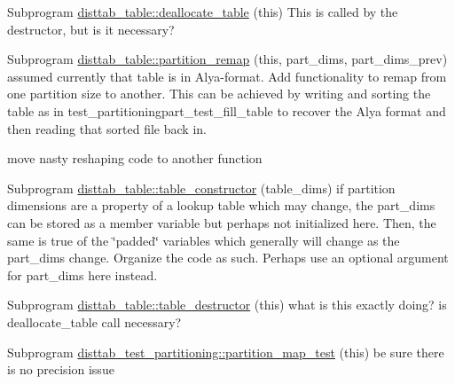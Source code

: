 
\begin{DoxyRefList}
\item[Subprogram \mbox{\hyperlink{namespacedisttab__table_ab8a2b8fd8aed669c2284a5b070f39492}{disttab\+\_\+table\+::deallocate\+\_\+table}} (this)]\label{todo__todo000004}%
%
This is called by the destructor, but is it necessary?  
\item[Subprogram \mbox{\hyperlink{namespacedisttab__table_a48241397777b4e586f1d9cf4389fae7d}{disttab\+\_\+table\+::partition\+\_\+remap}} (this, part\+\_\+dims, part\+\_\+dims\+\_\+prev)]\label{todo__todo000003}%
%
assumed currently that table is in Alya-\/format. Add functionality to remap from one partition size to another. This can be achieved by writing and sorting the table as in test\+\_\+partitioningpart\+\_\+test\+\_\+fill\+\_\+table to recover the Alya format and then reading that sorted file back in. 

move nasty reshaping code to another function  
\item[Subprogram \mbox{\hyperlink{namespacedisttab__table_a51096402e00064f68a6c890b6c0d8500}{disttab\+\_\+table\+::table\+\_\+constructor}} (table\+\_\+dims)]\label{todo__todo000001}%
%
if partition dimensions are a property of a lookup table which may change, the part\+\_\+dims can be stored as a member variable but perhaps not initialized here. Then, the same is true of the \char`\"{}padded\char`\"{} variables which generally will change as the part\+\_\+dims change. Organize the code as such. Perhaps use an optional argument for part\+\_\+dims here instead.  
\item[Subprogram \mbox{\hyperlink{namespacedisttab__table_a00320b1b054be17b502e8bc01bdfb8cd}{disttab\+\_\+table\+::table\+\_\+destructor}} (this)]\label{todo__todo000002}%
%
what is this exactly doing? is deallocate\+\_\+table call necessary?  
\item[Subprogram \mbox{\hyperlink{namespacedisttab__test__partitioning_a9e95059f35b6a076292c47ebb6a31763}{disttab\+\_\+test\+\_\+partitioning\+::partition\+\_\+map\+\_\+test}} (this)]\label{todo__todo000005}%
%
be sure there is no precision issue 
\end{DoxyRefList}
